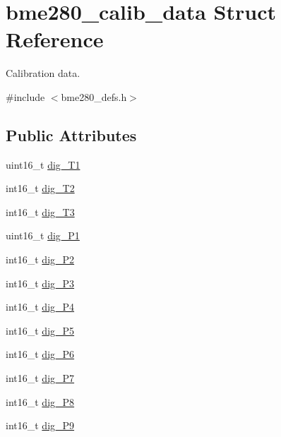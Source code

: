 \hypertarget{structbme280__calib__data}{}\section{bme280\+\_\+calib\+\_\+data Struct Reference}
\label{structbme280__calib__data}


Calibration data.  




{\ttfamily \#include $<$bme280\+\_\+defs.\+h$>$}

\subsection*{Public Attributes}
\textbf{ }\par
\begin{DoxyCompactItemize}
\item 
uint16\+\_\+t \hyperlink{structbme280__calib__data_af8eb813b4a350b19596105013792aee8}{dig\+\_\+\+T1}
\item 
int16\+\_\+t \hyperlink{structbme280__calib__data_a608c0112ccb3fdc3c11f1e174cdbde1b}{dig\+\_\+\+T2}
\item 
int16\+\_\+t \hyperlink{structbme280__calib__data_af04a21f46f9244b879ad16af5a40ebb2}{dig\+\_\+\+T3}
\item 
uint16\+\_\+t \hyperlink{structbme280__calib__data_aa2a4a84a415069af6292d92fa2517c18}{dig\+\_\+\+P1}
\item 
int16\+\_\+t \hyperlink{structbme280__calib__data_a13ddffe344b00ae3230f5412019c25c7}{dig\+\_\+\+P2}
\item 
int16\+\_\+t \hyperlink{structbme280__calib__data_a8e86eee62639bef1ded9f51b6c863577}{dig\+\_\+\+P3}
\item 
int16\+\_\+t \hyperlink{structbme280__calib__data_abd53f31d52c16118691b65a59f51e388}{dig\+\_\+\+P4}
\item 
int16\+\_\+t \hyperlink{structbme280__calib__data_a5583773f96cdaf8ccdd20412082d8542}{dig\+\_\+\+P5}
\item 
int16\+\_\+t \hyperlink{structbme280__calib__data_aa5781cae586a4b1ed76ad78050fec41a}{dig\+\_\+\+P6}
\item 
int16\+\_\+t \hyperlink{structbme280__calib__data_a647f5cb10618b453ecd9b8819068ad13}{dig\+\_\+\+P7}
\item 
int16\+\_\+t \hyperlink{structbme280__calib__data_a405be361198254a2522797bd38f7a2a0}{dig\+\_\+\+P8}
\item 
int16\+\_\+t \hyperlink{structbme280__calib__data_aaba752b373db185367a51c481bae6f75}{dig\+\_\+\+P9}

\end{DoxyCompactItemize}
